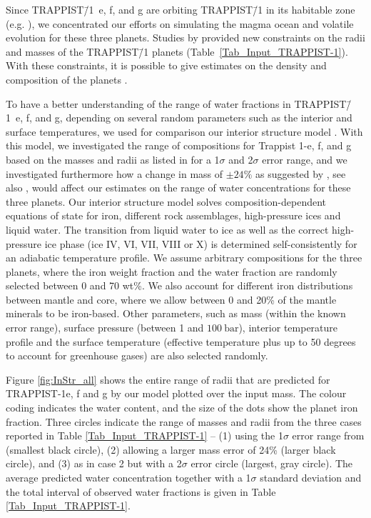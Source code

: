 \documentclass[oneside,twocolumn]{article}
\newcommand{\eg}{e.g. }
\begin{document}
Since TRAPPIST\=/1~e, f, and g are orbiting TRAPPIST\=/1 in its habitable zone (\eg \citet{Kasting1993,Abe2011,Kopparapu2014,Catling2018,Turbet2018,Chen2019}), we concentrated our efforts on simulating the magma ocean and volatile evolution for these three planets. Studies by \citet{Grimm2018} provided new constraints on the radii and masses of the TRAPPIST\=/1 planets (Table~\ref{Tab_Input_TRAPPIST-1}). With these constraints, it is possible to give estimates on the density and composition of the planets \citep{Dorn2018,Unterborn2018b,barr2018interior}. 

To have a better understanding of the range of water fractions in TRAPPIST\=/1~e, f, and g, depending on several random parameters such as the interior and surface temperatures, we used for comparison our interior structure model \citep{Noack2016}. With this model, we investigated the range of compositions for Trappist 1-e, f, and g based on the masses and radii as listed in \citet{Grimm2018} for a 1$\sigma$ and 2$\sigma$ error range, and we investigated furthermore how a change in mass of $\pm24\%$ as suggested by \citet{Demory2018Trappist}, see also \citet{Dorn2018}, would affect our estimates on the range of water concentrations for these three planets.
Our interior structure model solves composition-dependent equations of state for iron, different rock assemblages, high-pressure ices and liquid water. The transition from liquid water to ice as well as the correct high-pressure ice phase (ice IV, VI, VII, VIII or X) is determined self-consistently for an adiabatic temperature profile. We assume arbitrary compositions for the three planets, where the iron weight fraction and the water fraction are randomly selected between 0 and 70 wt\%. We also account for different iron distributions between mantle and core, where we allow between 0 and 20\% of the mantle minerals to be iron-based. Other parameters, such as mass (within the known error range), surface pressure (between 1 and $\SI{100}{\bar}$), interior temperature profile and the surface temperature (effective temperature plus up to 50 degrees to account for greenhouse gases) are also selected randomly.

Figure \ref{fig:InStr_all} shows the entire range of radii that are predicted for TRAPPIST-1e, f and g by our model plotted over the input mass. The colour coding indicates the water content, and the size of the dots show the planet iron fraction. Three circles indicate the range of masses and radii from the three cases reported in Table \ref{Tab_Input_TRAPPIST-1} -- (1) using the 1$\sigma$ error range from \citet{Grimm2018} (smallest black circle), (2) allowing a larger mass error of 24\% (larger black circle), and (3) as in case 2 but with a 2$\sigma$ error circle (largest, gray circle). The average predicted water concentration together with a 1$\sigma$ standard deviation and the total interval of observed water fractions is given in Table \ref{Tab_Input_TRAPPIST-1}.
\end{document}
